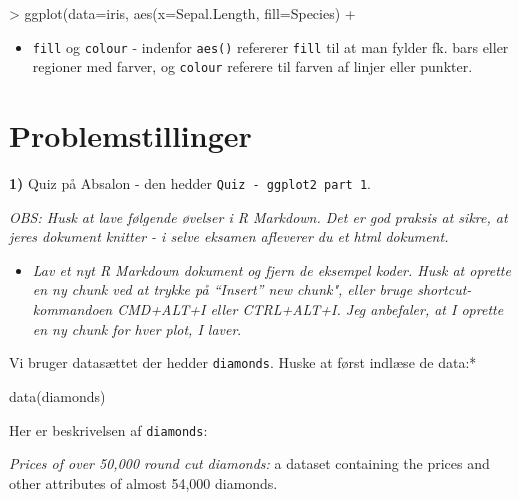 \documentclass[
]{book}
\newenvironment{Shaded}{\begin{snugshade}}{\end{snugshade}}
\newcommand{\AttributeTok}[1]{\textcolor[rgb]{0.77,0.63,0.00}{#1}}
\newcommand{\FunctionTok}[1]{\textcolor[rgb]{0.00,0.00,0.00}{#1}}
\newcommand{\NormalTok}[1]{#1}
\newcommand{\SpecialCharTok}[1]{\textcolor[rgb]{0.00,0.00,0.00}{#1}}
\providecommand{\tightlist}{%
  \setlength{\itemsep}{0pt}\setlength{\parskip}{0pt}}
\begin{document}
\begin{Shaded}
\begin{Highlighting}[]
\SpecialCharTok{\textgreater{}} \FunctionTok{ggplot}\NormalTok{(}\AttributeTok{data=}\NormalTok{iris, }\FunctionTok{aes}\NormalTok{(}\AttributeTok{x=}\NormalTok{Sepal.Length, }\AttributeTok{fill=}\NormalTok{Species)}
\SpecialCharTok{+} 
\end{Highlighting}
\end{Shaded}

\begin{itemize}
\tightlist
\item
  \texttt{fill} og \texttt{colour} - indenfor \texttt{aes()} refererer \texttt{fill} til at man fylder fk. bars eller regioner med farver, og \texttt{colour} referere til farven af linjer eller punkter.
\end{itemize}

\hypertarget{problemstillinger-2}{%
\section{Problemstillinger}\label{problemstillinger-2}}

\textbf{1)} Quiz på Absalon - den hedder \texttt{Quiz\ -\ ggplot2\ part\ 1}.

\emph{OBS: Husk at lave følgende øvelser i R Markdown. Det er god praksis at sikre, at jeres dokument knitter - i selve eksamen afleverer du et html dokument.}

\begin{itemize}
\tightlist
\item
  \emph{Lav et nyt R Markdown dokument og fjern de eksempel koder. Husk at oprette en ny chunk ved at trykke på ``Insert'' new chunk", eller bruge shortcut-kommandoen CMD+ALT+I eller CTRL+ALT+I. Jeg anbefaler, at I oprette en ny chunk for hver plot, I laver}.
\end{itemize}

Vi bruger datasættet der hedder \texttt{diamonds}. Huske at først indlæse de data:*

\begin{Shaded}
\begin{Highlighting}[]
\FunctionTok{data}\NormalTok{(diamonds)}
\end{Highlighting}
\end{Shaded}

Her er beskrivelsen af \texttt{diamonds}:

\emph{Prices of over 50,000 round cut diamonds:} a dataset containing the prices and other attributes of almost 54,000 diamonds.
\end{document}
